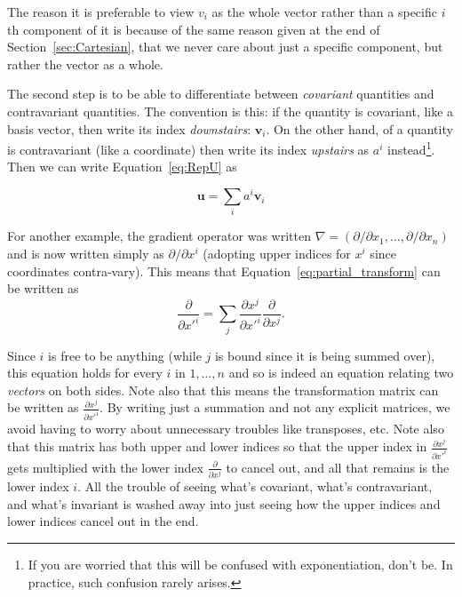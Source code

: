 \documentclass[../master.tex]{subfiles}
\begin{document}
	The reason it is preferable to view $v_i$ as the whole vector rather than a specific $i$th component of it is because of the same reason given at the end of Section~\ref{sec:Cartesian}, that we never care about just a specific component, but rather the vector as a whole. 
	
	The second step is to be able to differentiate between \emph{covariant} quantities and contravariant quantities. The convention is this: if the quantity is covariant, like a basis vector, then write its index \emph{downstairs}: $\mathbf v_i$. On the other hand, of a quantity is contravariant (like a coordinate) then write its index \emph{upstairs} as $a^i$ instead\footnote{If you are worried that this will be confused with exponentiation, don't be. In practice, such confusion rarely arises.}. Then we can write Equation~\eqref{eq:RepU} as 
	
	\begin{equation}
		\mathbf u = \sum_{i} a^i \mathbf v_i
	\end{equation}
	
	For another example, the gradient operator was written $\nabla = (\partial/\partial x_1, \dots, \partial/\partial x_n)$ and is now written simply as $\partial/\partial x^i$ (adopting upper indices for $x^i$ since coordinates contra-vary). This means that Equation~\eqref{eq:partial_transform} can be written as
	\begin{equation}\label{eq:partial_transform2}
		\frac{\partial}{\partial {x'}^i} = \sum_{j} \frac{\partial x^j}{\partial {x'}^i} \frac{\partial}{\partial x^j}.
	\end{equation}
	
	Since $i$ is free to be anything (while $j$ is bound since it is being summed over), this equation holds for every $i$ in $1,\dots, n$ and so is indeed an equation relating two \emph{vectors} on both sides. Note also that this means the transformation matrix can be written as $\frac{\partial x^j}{\partial {x'}^i}$. By writing just a summation and not any explicit matrices, we avoid having to worry about unnecessary troubles like transposes, etc. Note also that this matrix has both upper and lower indices so that the upper index in $\frac{\partial x^j}{\partial {x'}^i}$ gets multiplied with the lower index $\frac{\partial}{\partial x^j}$ to cancel out, and all that remains is the lower index $i$. All the trouble of seeing what's covariant, what's contravariant, and what's invariant is washed away into just seeing how the upper indices and lower indices cancel out in the end.
	
\end{document}
